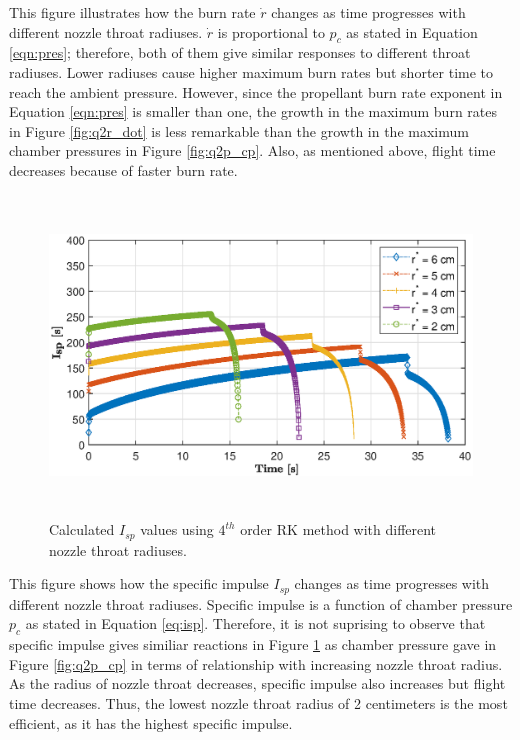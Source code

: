\documentclass[letterpaper,12pt]{article}
\begin{document}
This figure illustrates how the burn rate $\dot{r}$ changes as time progresses with different nozzle throat radiuses.
$\dot{r}$ is proportional to $p_c$ as stated in Equation \ref{eqn:pres}; therefore, both of them give 
similar responses to different throat radiuses. 
Lower radiuses cause higher maximum burn rates but shorter time to reach the ambient pressure. 
However, since the propellant burn rate exponent in 
Equation \ref{eqn:pres} is smaller than one, the growth in the maximum burn rates in Figure \ref{fig:q2r_dot} is 
less remarkable than the growth in the maximum chamber pressures in Figure \ref{fig:q2p_cp}. Also, as mentioned above,
flight time decreases because of faster burn rate.

\newpage

\begin{figure}[!h]
	\centering
	\includegraphics[height = 8.5cm]{graphs/q2_isp.eps}
	\caption{Calculated $I_{sp}$ values using $4^{th}$ order RK method with different nozzle throat radiuses.}
	\label{fig:q2I_sp}
\end{figure}

This figure shows how the specific impulse $I_{sp}$ changes as time progresses with different nozzle throat radiuses.
Specific impulse is a function of chamber pressure $p_c$ as stated in Equation \ref{eq:isp}. 
Therefore, it is not suprising to observe that specific impulse gives similiar reactions in Figure \ref{fig:q2I_sp} 
as chamber pressure gave in Figure \ref{fig:q2p_cp} in terms of relationship with increasing nozzle throat radius. 
As the radius of nozzle throat decreases, specific impulse also increases but flight time decreases. Thus, the 
lowest nozzle throat radius of 2 centimeters is the most efficient, as it has the highest specific impulse.
\end{document}
